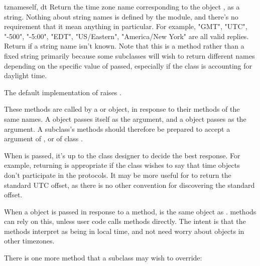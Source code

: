 \begin{methoddesc}{tzname}{self, dt}
  Return the time zone name corresponding to the 
  object , as a string.
  Nothing about string names is defined by the
   module, and there's no requirement that it mean
  anything in particular.  For example, "GMT", "UTC", "-500", "-5:00",
  "EDT", "US/Eastern", "America/New York" are all valid replies.  Return
   if a string name isn't known.  Note that this is a method
  rather than a fixed string primarily because some 
  subclasses will wish to return different names depending on the specific
  value of  passed, especially if the  class is
  accounting for daylight time.

  The default implementation of  raises
  .
\end{methoddesc}

These methods are called by a  or  object,
in response to their methods of the same names.  A 
object passes itself as the argument, and a  object passes
 as the argument.  A  subclass's methods should
therefore be prepared to accept a  argument of , or of
class .

When  is passed, it's up to the class designer to decide the
best response.  For example, returning  is appropriate if the
class wishes to say that time objects don't participate in the
 protocols.  It may be more useful for 
to return the standard UTC offset, as there is no other convention for
discovering the standard offset.

When a  object is passed in response to a
 method,  is the same object as
.   methods can rely on this, unless
user code calls  methods directly.  The intent is that
the  methods interpret  as being in local time,
and not need worry about objects in other timezones.

There is one more  method that a subclass may wish to
override:

